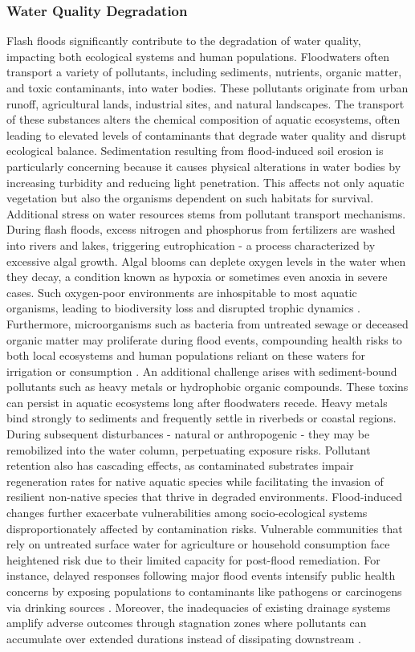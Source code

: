 \subsubsection{Water Quality Degradation}
Flash floods significantly contribute to the degradation of water quality, impacting both ecological systems and human populations. Floodwaters often transport a variety of pollutants, including sediments, nutrients, organic matter, and toxic contaminants, into water bodies. These pollutants originate from urban runoff, agricultural lands, industrial sites, and natural landscapes. The transport of these substances alters the chemical composition of aquatic ecosystems, often leading to elevated levels of contaminants that degrade water quality and disrupt ecological balance.
Sedimentation resulting from flood-induced soil erosion is particularly concerning because it causes physical alterations in water bodies by increasing turbidity and reducing light penetration. This affects not only aquatic vegetation but also the organisms dependent on such habitats for survival. Additional stress on water resources stems from pollutant transport mechanisms. During flash floods, excess nitrogen and phosphorus from fertilizers are washed into rivers and lakes, triggering eutrophication - a process characterized by excessive algal growth. Algal blooms can deplete oxygen levels in the water when they decay, a condition known as hypoxia or sometimes even anoxia in severe cases. Such oxygen-poor environments are inhospitable to most aquatic organisms, leading to biodiversity loss and disrupted trophic dynamics \citep{Abegaz2024}.
Furthermore, microorganisms such as bacteria from untreated sewage or deceased organic matter may proliferate during flood events, compounding health risks to both local ecosystems and human populations reliant on these waters for irrigation or consumption \citep{Pham2020}.
An additional challenge arises with sediment-bound pollutants such as heavy metals or hydrophobic organic compounds. These toxins can persist in aquatic ecosystems long after floodwaters recede. Heavy metals bind strongly to sediments and frequently settle in riverbeds or coastal regions. During subsequent disturbances - natural or anthropogenic - they may be remobilized into the water column, perpetuating exposure risks. Pollutant retention also has cascading effects, as contaminated substrates impair regeneration rates for native aquatic species while facilitating the invasion of resilient non-native species that thrive in degraded environments.
Flood-induced changes further exacerbate vulnerabilities among socio-ecological systems disproportionately affected by contamination risks. Vulnerable communities that rely on untreated surface water for agriculture or household consumption face heightened risk due to their limited capacity for post-flood remediation. For instance, delayed responses following major flood events intensify public health concerns by exposing populations to contaminants like pathogens or carcinogens via drinking sources \citep{Abegaz2024}. Moreover, the inadequacies of existing drainage systems amplify adverse outcomes through stagnation zones where pollutants can accumulate over extended durations instead of dissipating downstream \citep{Saad2024}.
